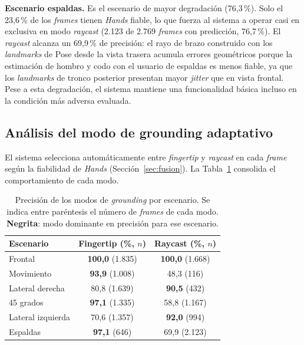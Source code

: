 \documentclass[12pt]{report} %
\begin{document}
\textbf{Escenario espaldas.} Es el escenario de mayor degradación (76{,}3\,\%). Solo el 23{,}6\,\% de los \textit{frames} tienen \textit{Hands} fiable, lo que fuerza al sistema a operar casi en exclusiva en modo \textit{raycast} (2.123 de 2.769 \textit{frames} con predicción, 76{,}7\,\%). El \textit{raycast} alcanza un 69{,}9\,\% de precisión: el rayo de brazo construido con los \textit{landmarks} de Pose desde la vista trasera acumula errores geométricos porque la estimación de hombro y codo con el usuario de espaldas es menos fiable, ya que los \textit{landmarks} de tronco posterior presentan mayor \textit{jitter} que en vista frontal. Pese a esta degradación, el sistema mantiene una funcionalidad básica incluso en la condición más adversa evaluada.

\subsection{Análisis del modo de grounding adaptativo}

El sistema selecciona automáticamente entre \textit{fingertip} y \textit{raycast} en cada \textit{frame} según la fiabilidad de \textit{Hands} (Sección~\ref{sec:fusion}). La Tabla~\ref{tab:grounding_modes} consolida el comportamiento de cada modo.

\begin{table}[H]
\caption{\label{tab:grounding_modes}Precisión de los modos de \textit{grounding} por escenario. Se indica entre paréntesis el número de \textit{frames} de cada modo. \textbf{Negrita}: modo dominante en precisión para ese escenario.}
\begin{tabular}{lcc}
\hline
\textbf{Escenario} & \textbf{Fingertip (\%, $n$)} & \textbf{Raycast (\%, $n$)} \\
\hline
Frontal           & \textbf{100{,}0} (1.835) & \textbf{100{,}0} (1.668) \\
Movimiento        & \textbf{93{,}9} (1.008)  &          48{,}3   (116) \\
Lateral derecha   &          80{,}8  (1.639) & \textbf{90{,}5}   (432) \\
45 grados         & \textbf{97{,}1} (1.335)  &          58{,}8  (1.167) \\
Lateral izquierda &          70{,}6  (1.357) & \textbf{92{,}0}   (994) \\
Espaldas          & \textbf{97{,}1}   (646)  &          69{,}9  (2.123) \\
\hline
\end{tabular}
\end{table}
\end{document}
